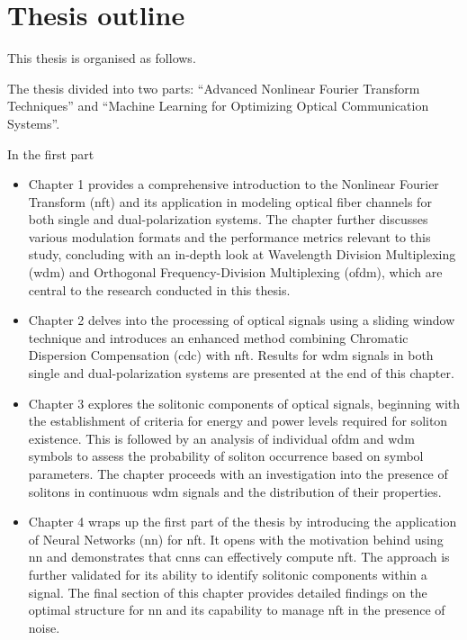 \section*{Thesis outline}
This thesis is organised as follows.

The thesis divided into two parts: ``Advanced Nonlinear Fourier Transform Techniques'' and ``Machine Learning for Optimizing Optical Communication Systems''.

In the first part
\begin{itemize}
    \item Chapter 1 provides a comprehensive introduction to the Nonlinear Fourier Transform (\acrshort{nft}) and its application in modeling optical fiber channels for both single and dual-polarization systems. The chapter further discusses various modulation formats and the performance metrics relevant to this study, concluding with an in-depth look at Wavelength Division Multiplexing (\acrshort{wdm}) and Orthogonal Frequency-Division Multiplexing (\acrshort{ofdm}), which are central to the research conducted in this thesis.
    
    \item Chapter 2 delves into the processing of optical signals using a sliding window technique and introduces an enhanced method combining Chromatic Dispersion Compensation (\acrshort{cdc}) with \acrshort{nft}. Results for \acrshort{wdm} signals in both single and dual-polarization systems are presented at the end of this chapter.
    
    \item Chapter 3 explores the solitonic components of optical signals, beginning with the establishment of criteria for energy and power levels required for soliton existence. This is followed by an analysis of individual \acrshort{ofdm} and \acrshort{wdm} symbols to assess the probability of soliton occurrence based on symbol parameters. The chapter proceeds with an investigation into the presence of solitons in continuous \acrshort{wdm} signals and the distribution of their properties.
    
    \item Chapter 4 wraps up the first part of the thesis by introducing the application of Neural Networks (\acrshort{nn}) for \acrshort{nft}. It opens with the motivation behind using \acrshort{nn} and demonstrates that \acrshort{cnn}s can effectively compute \acrshort{nft}. The approach is further validated for its ability to identify solitonic components within a signal. The final section of this chapter provides detailed findings on the optimal structure for \acrshort{nn} and its capability to manage \acrshort{nft} in the presence of noise.
\end{itemize}
